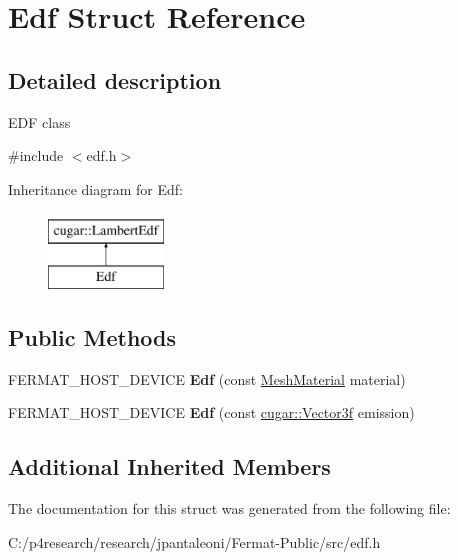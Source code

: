 \hypertarget{struct_edf}{}\section{Edf Struct Reference}
\label{struct_edf}


\subsection{Detailed description}
E\+DF class 

{\ttfamily \#include $<$edf.\+h$>$}

Inheritance diagram for Edf\+:\begin{figure}[H]
\begin{center}
\leavevmode
\includegraphics[height=2.000000cm]{struct_edf}
\end{center}
\end{figure}
\subsection*{Public Methods}
\begin{DoxyCompactItemize}
\item 
\mbox{\label{struct_edf_ae2d086124211b3f540cfa31df437af3e}} 
F\+E\+R\+M\+A\+T\+\_\+\+H\+O\+S\+T\+\_\+\+D\+E\+V\+I\+CE {\bfseries Edf} (const \hyperlink{struct_mesh_material}{Mesh\+Material} material)
\item 
\mbox{\label{struct_edf_ab4480c151d8548f761edd705125acecb}} 
F\+E\+R\+M\+A\+T\+\_\+\+H\+O\+S\+T\+\_\+\+D\+E\+V\+I\+CE {\bfseries Edf} (const \hyperlink{structcugar_1_1_vector}{cugar\+::\+Vector3f} emission)
\end{DoxyCompactItemize}
\subsection*{Additional Inherited Members}


The documentation for this struct was generated from the following file\+:\begin{DoxyCompactItemize}
\item 
C\+:/p4research/research/jpantaleoni/\+Fermat-\/\+Public/src/edf.\+h\end{DoxyCompactItemize}
